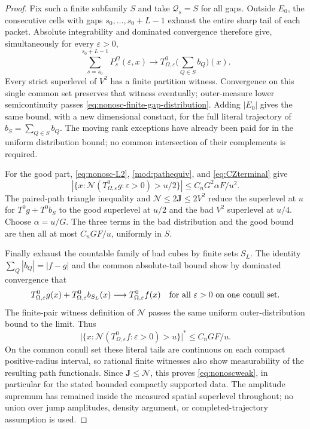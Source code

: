\documentclass[11pt]{article}
\numberwithin{equation}{section}
\theoremstyle{remark}
\theoremstyle{definition}
\newcommand{\NN}{\mathcal N}
\begin{document}
\begin{proof}
Fix such a finite subfamily $S$ and take $\mathcal Q_s=S$ for all gaps.
Outside $E_0$, the consecutive cells with gaps
$s_0,\ldots,s_0+L-1$ exhaust the entire sharp tail of each packet.
Absolute integrability and dominated convergence therefore give,
simultaneously for every $\varepsilon>0$,
\[
 \sum_{s=s_0}^{s_0+L-1}P_s^\Omega(\varepsilon,x)
 \longrightarrow T^0_{\Omega,\varepsilon}\Big(\sum_{Q\in S}b_Q\Big)(x).
\]
Every strict superlevel of $V^2$ has a finite partition witness.
Convergence on this single common set preserves that witness eventually;
outer-measure lower semicontinuity passes
\eqref{eq:nonosc-finite-gap-distribution}.  Adding $|E_0|$ gives the
same bound, with a new dimensional constant, for the full literal
trajectory of $b_S=\sum_{Q\in S}b_Q$.  The moving rank exceptions have
already been paid for in the uniform distribution bound; no common
intersection of their complements is required.

For the good part, \eqref{eq:nonosc-L2}, \eqref{mod:pathequiv}, and
\eqref{eq:CZterminal} give
\begin{equation}\label{eq:nonosc-good-inside}
 \left|\{x:\NN(T^0_{\Omega,\varepsilon}g:\varepsilon>0)>u/2\}\right|
 \le C_nG^2\alpha F/u^2.
\end{equation}
The paired-path triangle inequality and $\NN\le2\mathbf J\le2V^2$
reduce the superlevel at $u$ for $T^0g+T^0b_S$ to the good superlevel
at $u/2$ and the bad $V^2$ superlevel at $u/4$.
Choose $\alpha=u/G$.  The three terms in the bad distribution and the
good bound are then all at most $C_nGF/u$, uniformly in $S$.

Finally exhaust the countable family of bad cubes by finite sets $S_L$.
The identity $\sum_Q|b_Q|=|f-g|$ and the common absolute-tail bound show
by dominated convergence that
\[
 T^0_{\Omega,\varepsilon}g(x)+T^0_{\Omega,\varepsilon}b_{S_L}(x)
 \longrightarrow T^0_{\Omega,\varepsilon}f(x)
 \quad\hbox{for all $\varepsilon>0$ on one conull set}.
\]
The finite-pair witness definition of $\NN$ passes the same uniform
outer-distribution bound to the limit.  Thus
\[
 \bigl|\{x:\NN(T^0_{\Omega,\varepsilon}f:\varepsilon>0)>u\}\bigr|^*
 \le C_nGF/u.
\]
On the common conull set these literal tails are continuous on
each compact positive-radius interval, so rational finite witnesses also show
measurability of the resulting path functionals.  Since
$\mathbf J\le\NN$, this proves \eqref{eq:nonoscweak}, in particular for
the stated bounded compactly supported data.  The amplitude supremum has
remained inside the measured spatial superlevel throughout; no union over
jump amplitudes, density argument, or completed-trajectory assumption is
used.
\end{proof}
\end{document}
